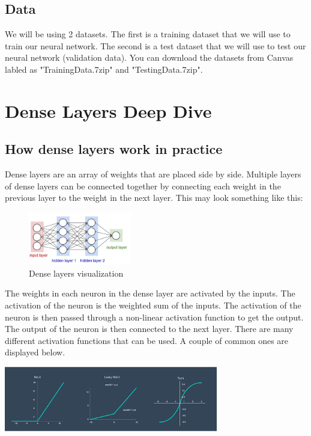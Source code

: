 \documentclass[11pt]{report}
\begin{document}
\pagebreak

\section{Data}
We will be using 2 datasets. The first is a training dataset that we will use to train our neural network. The second is a test dataset that we will use to test our neural network (validation data). You can download the datasets from Canvas labled as "TrainingData.7zip" and "TestingData.7zip". 

\chapter{Dense Layers Deep Dive}
\section{How dense layers work in practice}
Dense layers are an array of weights that are placed side by side. Multiple layers of dense layers can be connected together by connecting each weight in the previous layer to the weight in the next layer. This may look something like this:


    \begin{figure}[h]
        \begin{center}
        \includegraphics[width=0.4\textwidth]{denselayers.jpeg}
        \caption{Dense layers visualization}
        \label{fig:dense_layers}
        \end{center}
    \end{figure}

The weights in each neuron in the dense layer are activated by the inputs. The activation of the neuron is the weighted sum of the inputs. The activation of the neuron is then passed through a non-linear activation function to get the output. The output of the neuron is then connected to the next layer. There are many different activation functions that can be used. A couple of common ones are displayed below.
\begin{center}
    \includegraphics[width=0.7\textwidth]{activation functions 1.jpg}
\end{center}
\end{document}
